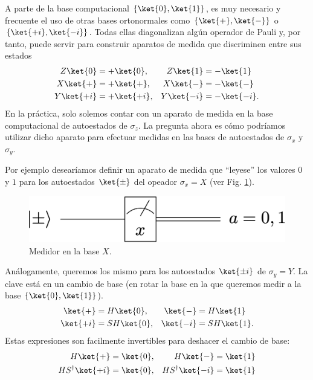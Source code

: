 \documentclass[a4paper,11pt]{book} %
\numberwithin{equation}{chapter}
\def\lch{\left\{}
\def\rch{\right\}}
\begin{document}
A parte de la base computacional $\{\ket{0},\ket{1} \}$, es muy necesario y frecuente el uso de otras bases ortonormales como  $\{\ket{+},\ket{-} \}$ o  $\{\ket{+i},\ket{-i} \}$. Todas ellas diagonalizan algún operador de Pauli y, por  tanto, puede servir para construir aparatos de medida que discriminen entre sus estados       
\begin{equation} 
\begin{aligned}
Z \ket{0} &=+ \ket{0}   , & Z \ket{1} &=-\ket{1} \\ 
X \ket{+} &=+ \ket{+}    ,& X \ket{-} &=-\ket{-} \\ 
Y \ket{+i} &=+ \ket{+i}  ,& Y \ket{-i} &=-\ket{-i}.
\end{aligned}
\end{equation}    
En la práctica, solo solemos contar con un aparato de medida en la base computacional de autoestados de $\sigma_z$. La pregunta ahora es cómo podríamos utilizar  dicho aparato para efectuar medidas en las bases de autoestados de $\sigma_x$ y $\sigma_y$.

Por ejemplo desearíamos definir un aparato de medida que ``leyese'' los valores $0$ y $1$ para los autoestados $\ket{\pm}$ del opeador $\sigma_x =  X$ (ver Fig. \ref{Fig_medidas1_meter_xbasis2}).
	\begin{figure}[H]
	\centering 
	\includegraphics[width=0.3\linewidth]{Figuras/Fig_medidas1_meter_xbasis2.png}
	\caption{Medidor en la base $X$.}
	\label{Fig_medidas1_meter_xbasis2}
	\end{figure}
Análogamente, queremos los mismo para los autoestados $\ket{\pm i}$ de $\sigma_y = Y$. La clave está en un cambio de base (en rotar la base en la que queremos medir a la base $\lch \ket{0}, \ket{1} \rch$). 
\begin{equation}
\begin{aligned}
\ket{+}  &= H\ket{0}  ,&  \ket{-}  &= H\ket{1}    \\ 
\ket{+i}  &= SH \ket{0}    ,&  \ket{-i}  &= SH\ket{1}   .
\end{aligned}
\end{equation}
Estas expresiones son facilmente invertibles para deshacer el cambio de base:
\begin{equation} \label{ec_medidas1_de_X_a_Z_Y_a_Z}
\begin{aligned}
H \ket{+}  &= \ket{0}                ,&  H\ket{-}  & = \ket{1}   \\ 
H S^\dagger \ket{+i}  &=  \ket{0}    ,&  H S^\dagger  \ket{-i}  & = \ket{1} 
\end{aligned}
\end{equation}
\end{document}
